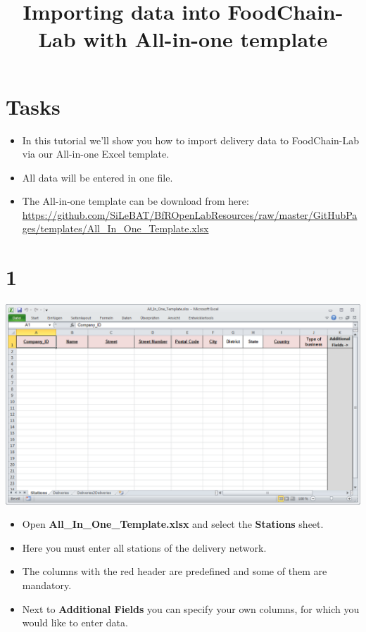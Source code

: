 \documentclass{beamer}
\title{Importing data into FoodChain-Lab with All-in-one template}
\date{}
\begin{document}
\maketitle

\section{Tasks}
\begin{frame}
	\begin{itemize}
		\item In this tutorial we'll show you how to import delivery data to FoodChain-Lab via our All-in-one Excel template.
		\item All data will be entered in one file.
		\item The All-in-one template can be download from here: \url{https://github.com/SiLeBAT/BfROpenLabResources/raw/master/GitHubPages/templates/All_In_One_Template.xlsx}
	\end{itemize}
\end{frame}
 
\section{1}
\begin{frame}
	\begin{center}
  		\includegraphics[height=0.5\textheight]{1.png}
	\end{center}
	\begin{itemize}
		\item Open \textbf{All\_In\_One\_Template.xlsx} and select the \textbf{Stations} sheet.
		\item Here you must enter all stations of the delivery network.
		\item The columns with the red header are predefined and some of them are mandatory.
		\item Next to \textbf{Additional Fields} you can specify your own columns, for which you would like to enter data.
	\end{itemize}
\end{frame}
\end{document}
